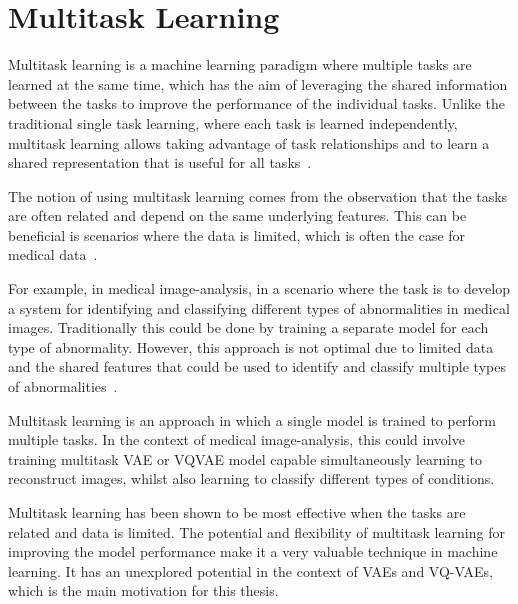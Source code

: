 \section{Multitask Learning}

Multitask learning is a machine learning paradigm where multiple tasks are learned at the same time, which has the aim of leveraging the shared information between the tasks to improve the performance of the individual tasks. Unlike the traditional single task learning, where each task is learned independently, multitask learning allows taking advantage of task relationships and to learn a shared representation that is useful for all tasks~\cite{multitasklearning}.

The notion of using multitask learning comes from the observation that the tasks are often related and depend on the same underlying features. This can be beneficial is scenarios where the data is limited, which is often the case for medical data~\cite{medicalMultiTask}.

For example, in medical image-analysis, in a scenario where the task is to develop a system for identifying and classifying different types of abnormalities in medical images. Traditionally this could be done by training a separate model for each type of abnormality. However, this approach is not optimal due to limited data and the shared features that could be used to identify and classify multiple types of abnormalities~\cite{multitasklearning}.

Multitask learning is an approach in which a single model is trained to perform multiple tasks. In the context of medical image-analysis, this could involve training multitask VAE or VQVAE model capable simultaneously learning to reconstruct images, whilst also learning to classify different types of conditions. 

Multitask learning has been shown to be most effective when the tasks are related and data is limited. The potential and flexibility of multitask learning for improving the model performance make it a very valuable technique in machine learning. It has an unexplored potential in the context of VAEs and VQ-VAEs, which is the main motivation for this thesis.








